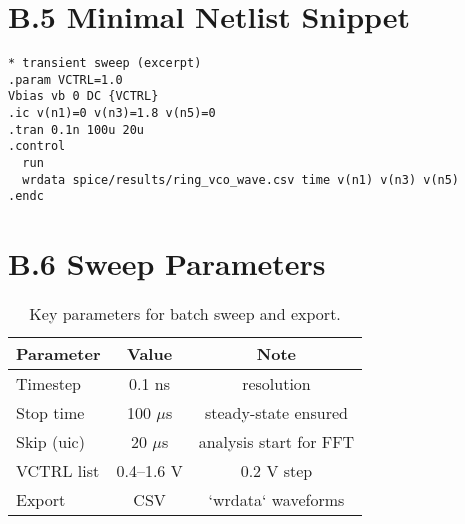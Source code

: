 \section*{B.5 Minimal Netlist Snippet}
\begin{lstlisting}[style=codespice, caption={Transient sweep excerpt (SPICE)}]
* transient sweep (excerpt)
.param VCTRL=1.0
Vbias vb 0 DC {VCTRL}
.ic v(n1)=0 v(n3)=1.8 v(n5)=0
.tran 0.1n 100u 20u
.control
  run
  wrdata spice/results/ring_vco_wave.csv time v(n1) v(n3) v(n5)
.endc
\end{lstlisting}

\section*{B.6 Sweep Parameters}
\begin{table}[H]
  \centering
  \begin{tabular}{lcc}
    \toprule
    Parameter & Value & Note \\
    \midrule
    Timestep & 0.1 ns & resolution \\
    Stop time & 100 \(\mu\)s & steady-state ensured \\
    Skip (uic) & 20 \(\mu\)s & analysis start for FFT \\
    VCTRL list & 0.4--1.6 V & 0.2 V step \\
    Export & CSV & `wrdata` waveforms \\
    \bottomrule
  \end{tabular}
  \caption{Key parameters for batch sweep and export.}
\end{table}


